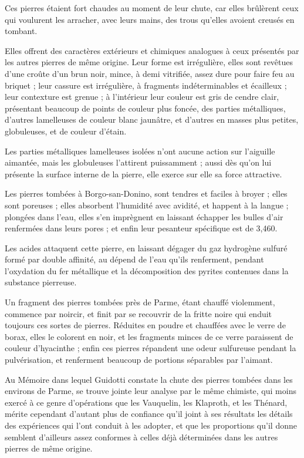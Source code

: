\documentclass[a4paper, 12pt, oneside, french]{article}
\begin{document}
Ces pierres étaient fort chaudes au moment de leur chute, car elles brûlèrent ceux qui voulurent les arracher, avec leurs mains, des trous qu'elles avoient creusés en tombant.

\og Elles offrent des caractères extérieurs et chimiques analogues à ceux présentés par les autres pierres de même origine. Leur forme est irrégulière, elles sont revêtues d'une croûte d'un brun noir, mince, à demi vitrifiée, assez dure pour faire feu au briquet ; leur cassure est irrégulière, à fragments indéterminables et écailleux ; leur contexture est grenue ; à l'intérieur leur couleur est gris de cendre clair, présentant beaucoup de points de couleur plus foncée, des parties métalliques, d'autres lamelleuses de couleur blanc jaunâtre, et d'autres en masses plus petites, globuleuses, et de couleur d'étain. \fg

\og Les parties métalliques lamelleuses isolées n'ont aucune action sur l'aiguille aimantée, mais les globuleuses l'attirent puissamment ; aussi dès qu'on lui présente la surface interne de la pierre, elle exerce sur elle sa force attractive. \fg

\og Les pierres tombées à Borgo-san-Donino, sont tendres et faciles à broyer ; elles sont poreuses ; elles absorbent l'humidité avec avidité, et happent à la langue ; plongées dans l'eau, elles s'en imprègnent en laissant échapper les bulles d'air renfermées dans leurs pores ; et enfin leur pesanteur spécifique est de 3,460. \fg

\og Les acides attaquent cette pierre, en laissant dégager du gaz hydrogène sulfuré formé par double affinité, au dépend de l'eau qu'ils renferment, pendant l'oxydation du fer métallique et la décomposition des pyrites contenues dans la substance pierreuse. \fg

Un fragment des pierres tombées près de Parme, étant chauffé violemment, commence par noircir, et finit par se recouvrir de la fritte noire qui enduit toujours ces sortes de pierres. Réduites en poudre et chauffées avec le verre de borax, elles le colorent en noir, et les fragments minces de ce verre paraissent de couleur d'hyacinthe ; enfin ces pierres répandent une odeur sulfureuse pendant la pulvérisation, et renferment beaucoup de portions séparables par l'aimant.

Au Mémoire dans lequel Guidotti constate la chute des pierres tombées dans les environs de Parme, se trouve jointe leur analyse par le même chimiste, qui moins exercé à ce genre d'opérations que les Vauquelin, les Klaproth, et les Thénard, mérite cependant d'autant plus de confiance qu'il joint à ses résultats les détails des expériences qui l'ont conduit à les adopter, et que les proportions qu'il donne semblent d'ailleurs assez conformes à celles déjà déterminées dans les autres pierres de même origine.
\end{document}
